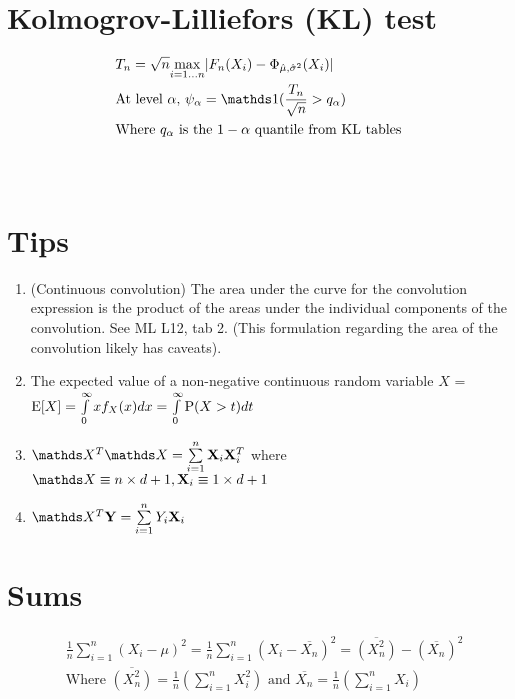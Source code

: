 \section {Kolmogrov-Lilliefors (KL) test}
\begin {equation} \begin {split}
& T_n = \sqrt{n} \underset{i = 1 \ldots n} {\max} \abs {F_n(X_i) - \Phi_{\hat \mu, \hat \sigma^2}(X_i)} \\
& \text {At level $\alpha$, } \psi_{\alpha}  = \ind{\frac {T_n}{\sqrt{n}} > q_{\alpha}} \\
& \text {Where $q_{\alpha}$ is the $1 - \alpha$ quantile from KL tables} \\
\\
\\
\end {split} \end {equation}

\section {Tips}
\begin {enumerate}
\item (Continuous convolution) The area under the curve for the convolution expression is the product of the areas under the individual components of the convolution. See ML L12, tab 2. (This formulation regarding the area of the convolution likely has caveats).
\item The expected value of a non-negative continuous random variable $X$ = $\mathrm{E}[X] = \int \limits_0^\infty x f_X(x) dx = \int \limits_0^\infty \mathrm{P} (X > t) dt$
\item $\mX^T \mX = \sum \limits_{i=1}^{n} \vX_i \vX_i^T$ where $\mX \equiv n \times d + 1, \vX_i \equiv 1 \times d + 1$
\item $\mX^T \vY = \sum \limits_{i=1}^{n} Y_i \vX_i$
\end {enumerate}

\section {Sums}
\begin {equation} \begin {split}
& \frac {1} {n} {\sum \limits_{i=1}^{n} (X_i - \mu)^2} = \frac {1} {n} {\sum \limits_{i=1}^{n} (X_i - \overline{X_n})^2} = \overline{(X_n^2)} - (\overline{X_n})^2  \\
& \text {Where } \overline{(X_n^2)} = \frac {1}{n} (\sum \limits_{i=1}^{n} X_i^2) \text { and } \overline{X_n} = \frac {1}{n} (\sum \limits_{i=1}^{n} X_i) \\
\end {split} \end {equation}

